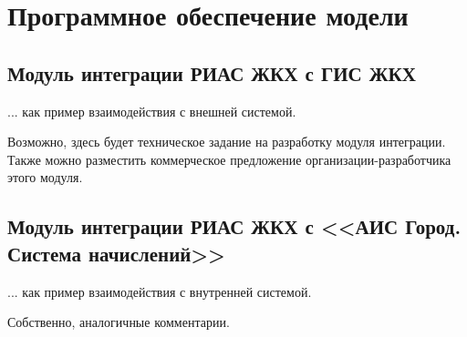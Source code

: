 \section{Программное обеспечение модели}

\subsection{Модуль интеграции РИАС ЖКХ с ГИС ЖКХ}

... как пример взаимодействия с внешней системой.

Возможно, здесь будет техническое задание на разработку модуля интеграции.
Также можно разместить коммерческое предложение организации-разработчика этого модуля.

\subsection{Модуль интеграции РИАС ЖКХ с <<АИС Город. Система начислений>>}

... как пример взаимодействия с внутренней системой.

Собственно, аналогичные комментарии.

\clearpage
\newpage